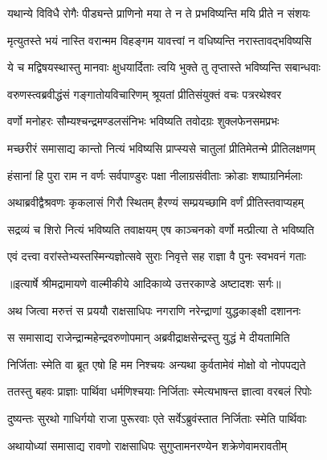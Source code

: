 \twolineshloka
{यथान्ये विविधै रोगैः पीड्यन्ते प्राणिनो मया}
{ते न ते प्रभविष्यन्ति मयि प्रीते न संशयः} %

\twolineshloka
{मृत्युतस्ते भयं नास्ति वरान्मम विहङ्गम}
{यावत्त्वां न वधिष्यन्ति नरास्तावद्भविष्यसि} %

\twolineshloka
{ये च मद्विषयस्थास्तु मानवाः क्षुधयार्दिताः}
{त्वयि भुक्ते तु तृप्तास्ते भविष्यन्ति सबान्धवाः} %

\twolineshloka
{वरुणस्त्वब्रवीद्धंसं गङ्गातोयविचारिणम्}
{श्रूयतां प्रीतिसंयुक्तं वचः पत्ररथेश्वर} %

\twolineshloka
{वर्णो मनोहरः सौम्यश्चन्द्रमण्डलसंनिभः}
{भविष्यति तवोदग्रः शुक्लफेनसमप्रभः} %

\twolineshloka
{मच्छरीरं समासाद्य कान्तो नित्यं भविष्यसि}
{प्राप्स्यसे चातुलां प्रीतिमेतन्मे प्रीतिलक्षणम्} %

\twolineshloka
{हंसानां हि पुरा राम न वर्णः सर्वपाण्डुरः}
{पक्षा नीलाग्रसंवीताः क्रोडाः शष्पाग्रनिर्मलाः} %

\twolineshloka
{अथाब्रवीद्वैश्रवणः कृकलासं गिरौ स्थितम्}
{हैरण्यं सम्प्रयच्छामि वर्णं प्रीतिस्तवाप्यहम्} %

\twolineshloka
{सद्रव्यं च शिरो नित्यं भविष्यति तवाक्षयम्}
{एष काञ्चनको वर्णो मत्प्रीत्या ते भविष्यति} %

\twolineshloka
{एवं दत्त्वा वरांस्तेभ्यस्तस्मिन्यज्ञोत्सवे सुराः}
{निवृत्ते सह राज्ञा वै पुनः स्वभवनं गताः} %


{॥इत्यार्षे श्रीमद्रामायणे वाल्मीकीये आदिकाव्ये उत्तरकाण्डे अष्टादशः सर्गः॥}


\twolineshloka
{अथ जित्वा मरुत्तं स प्रययौ राक्षसाधिपः}
{नगराणि नरेन्द्राणां युद्धकाङ्क्षी दशाननः} %

\twolineshloka
{स समासाद्य राजेन्द्रान्महेन्द्रवरुणोपमान्}
{अब्रवीद्राक्षसेन्द्रस्तु युद्धं मे दीयतामिति} %

\twolineshloka
{निर्जिताः स्मेति वा ब्रूत एषो हि मम निश्चयः}
{अन्यथा कुर्वतामेवं मोक्षो वो नोपपद्यते} %

\twolineshloka
{ततस्तु बहवः प्राज्ञाः पार्थिवा धर्मणिश्चयाः}
{निर्जिताः स्मेत्यभाषन्त ज्ञात्वा वरबलं रिपोः} %

\twolineshloka
{दुष्यन्तः सुरथो गाधिर्गयो राजा पुरूरवाः}
{एते सर्वेऽब्रुवंस्तात निर्जिताः स्मेति पार्थिवाः} %

\twolineshloka
{अथायोध्यां समासाद्य रावणो राक्षसाधिपः}
{सुगुप्तामनरण्येन शक्रेणेवामरावतीम्} %


